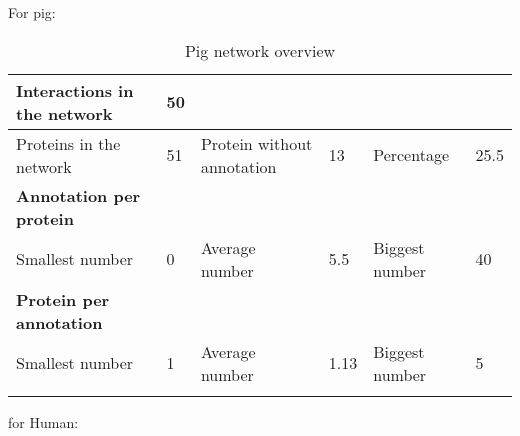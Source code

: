 \documentclass[10pt,a4paper]{article}
\begin{document}
\begin{enumerate}
	For pig: 
	
	\begin{table}[H]
		\centering
		\caption{Pig network overview}
		\label{pignetworkoverview}
		\begin{tabular}{llllll}
			\hline
			\multicolumn{1}{|l|}{Interactions in the network}     & \multicolumn{1}{l|}{50} & \multicolumn{1}{l|}{}                           & \multicolumn{1}{l|}{}    & \multicolumn{1}{l|}{}               & \multicolumn{1}{l|}{}     \\ \hline
			\multicolumn{1}{|l|}{Proteins in the network}         & \multicolumn{1}{l|}{51} & \multicolumn{1}{l|}{Protein without annotation} & \multicolumn{1}{l|}{13}  & \multicolumn{1}{l|}{Percentage}     & \multicolumn{1}{l|}{25.5} \\ \hline
			\multicolumn{1}{|l|}{\textbf{Annotation per protein}} & \multicolumn{1}{l|}{}   & \multicolumn{1}{l|}{}                           & \multicolumn{1}{l|}{}    & \multicolumn{1}{l|}{}               & \multicolumn{1}{l|}{}     \\ \hline
			\multicolumn{1}{|l|}{Smallest number}                 & \multicolumn{1}{l|}{0}  & \multicolumn{1}{l|}{Average number}             & \multicolumn{1}{l|}{5.5} & \multicolumn{1}{l|}{Biggest number} & \multicolumn{1}{l|}{40}   \\ \hline
			\multicolumn{1}{|l|}{\textbf{Protein per annotation}} & \multicolumn{1}{l|}{}   & \multicolumn{1}{l|}{}                           & \multicolumn{1}{l|}{}    & \multicolumn{1}{l|}{}               & \multicolumn{1}{l|}{}     \\ \hline
			\multicolumn{1}{|l|}{Smallest number}                 & \multicolumn{1}{l|}{1}  & \multicolumn{1}{l|}{Average number}             & \multicolumn{1}{l|}{1.13} & \multicolumn{1}{l|}{Biggest number} & \multicolumn{1}{l|}{5} \\ \hline
			&                         &                                                 &                          &                                     &                          
		\end{tabular}
	\end{table}
	
	
	for Human: 
	

\end{enumerate}
\end{document}
